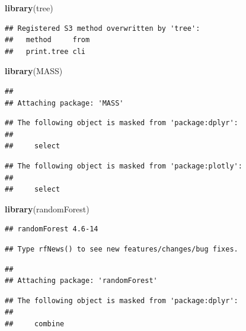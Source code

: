 \documentclass[
]{article}
\newenvironment{Shaded}{\begin{snugshade}}{\end{snugshade}}
\newcommand{\KeywordTok}[1]{\textcolor[rgb]{0.13,0.29,0.53}{\textbf{#1}}}
\newcommand{\NormalTok}[1]{#1}
\begin{document}
\begin{Shaded}
\begin{Highlighting}[]
\KeywordTok{library}\NormalTok{(tree)}
\end{Highlighting}
\end{Shaded}

\begin{verbatim}
## Registered S3 method overwritten by 'tree':
##   method     from
##   print.tree cli
\end{verbatim}

\begin{Shaded}
\begin{Highlighting}[]
\KeywordTok{library}\NormalTok{(MASS)}
\end{Highlighting}
\end{Shaded}

\begin{verbatim}
## 
## Attaching package: 'MASS'
\end{verbatim}

\begin{verbatim}
## The following object is masked from 'package:dplyr':
## 
##     select
\end{verbatim}

\begin{verbatim}
## The following object is masked from 'package:plotly':
## 
##     select
\end{verbatim}

\begin{Shaded}
\begin{Highlighting}[]
\KeywordTok{library}\NormalTok{(randomForest)}
\end{Highlighting}
\end{Shaded}

\begin{verbatim}
## randomForest 4.6-14
\end{verbatim}

\begin{verbatim}
## Type rfNews() to see new features/changes/bug fixes.
\end{verbatim}

\begin{verbatim}
## 
## Attaching package: 'randomForest'
\end{verbatim}

\begin{verbatim}
## The following object is masked from 'package:dplyr':
## 
##     combine
\end{verbatim}
\end{document}
